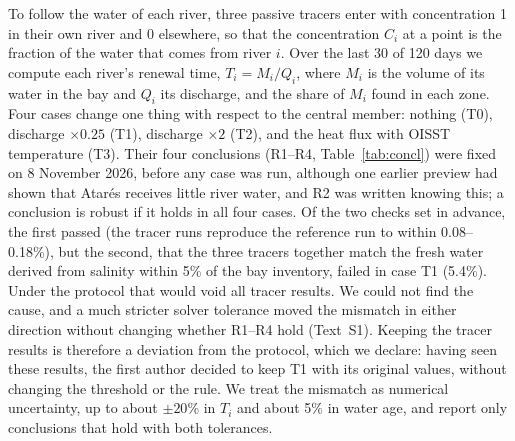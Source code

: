 \documentclass[a4paper,fleqn]{ems-dc}
\begin{document}
To follow the water of each river, three passive tracers enter with concentration 1 in their
own river and 0 elsewhere, so that the concentration $C_i$ at a point is the fraction of the
water that comes from river $i$. Over the last 30 of 120 days we compute each river's
renewal time, $T_i = M_i/Q_i$, where $M_i$ is the volume of its water in the bay and $Q_i$
its discharge, and the share of $M_i$ found in each zone. Four cases change one thing with
respect to the central member: nothing (T0), discharge $\times0.25$ (T1), discharge
$\times2$ (T2), and the heat flux with OISST temperature (T3). Their four conclusions (R1--R4,
Table~\ref{tab:concl}) were fixed on 8 November 2026, before any case was run, although one
earlier preview had shown that Atar\'es receives little river water, and R2 was written
knowing this; a conclusion is robust if it holds in all four cases. Of the two checks set in
advance, the first passed (the tracer runs reproduce the reference run to within
0.08--0.18\%), but the second, that the three tracers together match the fresh water derived
from salinity within 5\% of the bay inventory, failed in case T1 (5.4\%). Under the protocol
that would void all tracer results. We could not find the cause, and a much stricter solver
tolerance moved the mismatch in either direction without changing whether R1--R4 hold
(Text~S1). Keeping the tracer results is therefore a deviation from the protocol, which we
declare: having seen these results, the first author decided to keep T1 with its original
values, without changing the threshold or the rule. We treat the mismatch as numerical
uncertainty, up to about $\pm20$\% in $T_i$ and about 5\% in water age, and report only
conclusions that hold with both tolerances.
\end{document}
